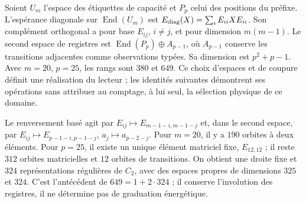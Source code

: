 Soient $U_m$ l’espace des étiquettes de capacité et $P_p$ celui des positions
du préfixe. L’espérance diagonale sur $\operatorname{End}(U_m)$ est
$E_{\rm diag}(X)=\sum_iE_{ii}XE_{ii}$. Son complément orthogonal a pour
base $E_{ij}$, $i\ne j$, et pour dimension $m(m-1)$. Le second espace de
registres est $\operatorname{End}(P_p)\oplus A_{p-1}$, où $A_{p-1}$
conserve les transitions adjacentes comme observations typées. Sa
dimension est $p^2+p-1$. Avec $m=20$, $p=25$, les rangs sont $380$ et $649$.
Ce choix d’espaces et de coupure définit une réalisation du lecteur ;
les identités suivantes démontrent ses opérations sans attribuer au
comptage, à lui seul, la sélection physique de ce domaine.

Le renversement basé agit par
$E_{ij}\mapsto E_{m-1-i,m-1-j}$ et, dans le second espace, par
$E_{ij}\mapsto E_{p-1-i,p-1-j}$, $a_j\mapsto a_{p-2-j}$.
Pour $m=20$, il y a $190$ orbites à deux éléments. Pour $p=25$, il existe un
unique élément matriciel fixe, $E_{12,12}$ ; il reste $312$ orbites
matricielles et $12$ orbites de transitions. On obtient une droite fixe et
$324$ représentations régulières de $C_2$, avec des espaces propres de dimensions
$325$ et $324$. C’est l’antécédent de $649=1+2\cdot324$ ; il conserve
l’involution des registres, il ne détermine pas de graduation énergétique.

